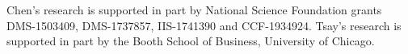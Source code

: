 \address{Ruey Tsay\\
  Booth School of Business\\
  University of Chicago\\
  5807 S. Woodlawn Ave, Chicago, IL 60637\\
  USA\\
  }
  
\noindent Chen's research is supported in part by
National Science Foundation grants DMS-1503409, DMS-1737857, IIS-1741390 and CCF-1934924. Tsay's research is supported in part by the Booth School of Business, University of Chicago.

